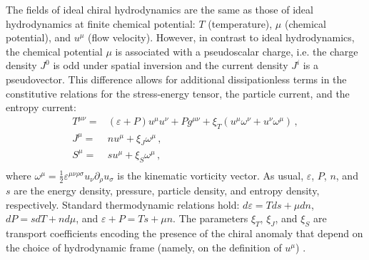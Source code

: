 \documentclass[a4paper, amsfonts, amssymb, amsmath, reprint, showkeys, nofootinbib, twoside,notitlepage,onecolumn,preprintnumbers]{revtex4-2}
\theoremstyle{definition}
\theoremstyle{theorem}
\theoremstyle{corollary}
\begin{document}
The fields of ideal chiral hydrodynamics are the same as those of ideal hydrodynamics at finite chemical potential: $T$ (temperature), $\mu$ (chemical potential), and $u^\mu$ (flow velocity). However, in contrast to ideal hydrodynamics, the chemical potential $\mu$ is associated with a pseudoscalar charge, i.e. the charge density $J^0$ is odd under spatial inversion and the current density $J^i$ is a pseudovector. This difference allows for additional dissipationless terms in the constitutive relations for the stress-energy tensor, the particle current, and the entropy current:
\begin{equation}\label{CHIR}
    \begin{split}
T^{\mu \nu}={}& (\varepsilon{+}P)u^\mu u^\nu +Pg^{\mu \nu}+\xi_T (u^\mu \omega^\nu{+}u^\nu \omega^\mu) \, , \\
J^{\mu}={}& nu^\mu +\xi_J \omega^\mu \, , \\
S^{\mu}={}& su^\mu +\xi_S \omega^\mu \, , \\
    \end{split}
\end{equation}
where $\omega^\mu = \frac{1}{2}\varepsilon^{\mu \nu \rho \sigma}u_\nu \partial_\rho u_\sigma$ is the kinematic vorticity vector. As usual, $\varepsilon$, $P$, $n$, and $s$ are the energy density, pressure, particle density, and entropy density, respectively. Standard thermodynamic relations hold: $d\varepsilon=Tds+\mu dn$, $dP=sdT+nd\mu$, and $\varepsilon{+}P=Ts{+}\mu n$. The parameters $\xi_T$, $\xi_J$, and $\xi_S$ are transport coefficients encoding the presence of the chiral anomaly that depend on the choice of hydrodynamic frame (namely, on the definition of $u^\mu$) \cite{Son:2009tf,Rajagopal:2015roa, Stephanov:2015roa, Chen:2015gta, Yang:2018lew,Speranza2021}.
\end{document}
